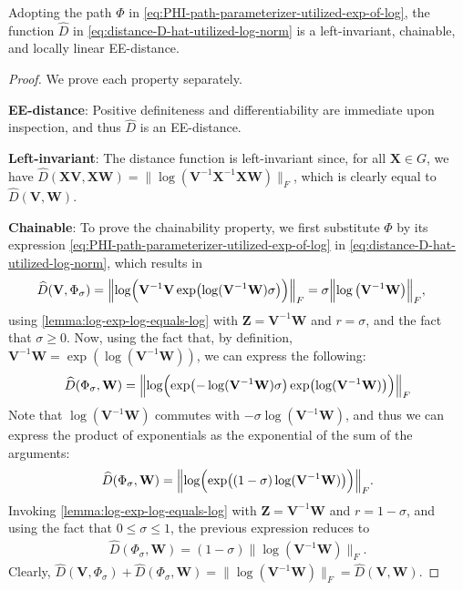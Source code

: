 \begin{proposition}
    Adopting the path $\Phi$ in \eqref{eq:PHI-path-parameterizer-utilized-exp-of-log}, the function $\widehat{D}$ in \eqref{eq:distance-D-hat-utilized-log-norm} is a left-invariant, chainable, and locally linear EE-distance.
\end{proposition}
\begin{proof}
    We prove each property separately. 
    
    \textbf{EE-distance}: Positive definiteness and differentiability are immediate upon inspection, and thus $\widehat{D}$ is an EE-distance.
    
    \textbf{Left-invariant}: The distance function is left-invariant since, for all $\mathbf{X} \in G$, we have $\widehat{D}(\mathbf{X}\mathbf{V}, \mathbf{X}\mathbf{W}) =  \|\log{(\mathbf{V}^{-1}\mathbf{X}^{-1}\mathbf{X}\mathbf{W})}\|_F$, which is clearly equal to $\widehat{D}(\mathbf{V}, \mathbf{W})$.

    \textbf{Chainable}: To prove the chainability property, we first substitute $\Phi$ by its expression \eqref{eq:PHI-path-parameterizer-utilized-exp-of-log} in \eqref{eq:distance-D-hat-utilized-log-norm}, which results in
    \begin{align}
             \widehat{D}(\mathbf{V}, \Phi_\sigma) &= \Bigl\|\log\Bigl(\mathbf{V}^{-1}\mathbf{V}\exp\bigl(\log(\mathbf{V}^{-1}\mathbf{W})\sigma\bigr)\Bigr)\Bigr\|_F
             =\sigma\Bigl\|\log{\left(\mathbf{V}^{-1}\mathbf{W}\right)}\Bigr\|_F,
    \end{align}
    using \cref{lemma:log-exp-log-equals-log} with $\mathbf{Z}=\mathbf{V}^{-1}\mathbf{W}$ and $r=\sigma$, and the fact that $\sigma\ge0$. Now, using the fact that, by definition, $\mathbf{V}^{-1}\mathbf{W}=\exp(\log(\mathbf{V}^{-1}\mathbf{W}))$, we can express the following:
    \begin{align}
             \widehat{D}(\Phi_\sigma, \mathbf{W}) = \Bigl\|\log\Bigl(\exp\bigl(-\log(\mathbf{V}^{-1}\mathbf{W})\sigma\bigr)\exp\bigl(\log(\mathbf{V}^{-1}\mathbf{W})\bigr)\Bigr)\Bigr\|_F
    \end{align}
    Note that $\log(\mathbf{V}^{-1}\mathbf{W})$ commutes with $-\sigma\log(\mathbf{V}^{-1}\mathbf{W})$, and thus we can express the product of exponentials as the exponential of the sum of the arguments:
    \begin{align}
        \widehat{D}(\Phi_\sigma, \mathbf{W}) = \Bigl\|\log\Bigl(\exp\bigl((1-\sigma)\log(\mathbf{V}^{-1}\mathbf{W})\bigr)\Bigr)\Bigr\|_F.
    \end{align}
    Invoking \cref{lemma:log-exp-log-equals-log} with $\mathbf{Z}=\mathbf{V}^{-1}\mathbf{W}$ and $r=1-\sigma$, and using the fact that $0\le\sigma\le1$, the previous expression reduces to 
    \begin{align}
       \widehat{D}(\Phi_\sigma, \mathbf{W}) =(1-\sigma)\|\log{\left(\mathbf{V}^{-1}\mathbf{W}\right)}\|_F.
    \end{align}
    Clearly, $\widehat{D}(\mathbf{V}, \Phi_\sigma) + \widehat{D}(\Phi_\sigma, \mathbf{W}) = \|\log(\mathbf{V}^{-1}\mathbf{W})\|_F = \widehat{D}(\mathbf{V}, \mathbf{W})$. 
    

\end{proof}
